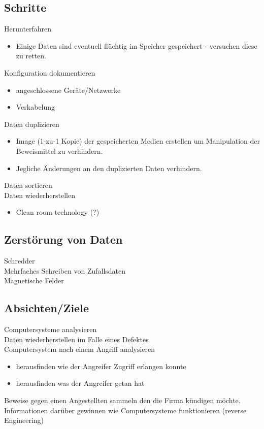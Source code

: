 \documentclass{article} %
\begin{document}
\subsection{Schritte}
Herunterfahren
\begin{itemize}
	\item Einige Daten sind eventuell flüchtig im Speicher gespeichert - versuchen diese zu retten.
\end{itemize}
Konfiguration dokumentieren
\begin{itemize}
	\item angeschlossene Geräte/Netzwerke
    \item Verkabelung
\end{itemize}
Daten duplizieren
\begin{itemize}
	\item Image (1-zu-1 Kopie) der gespeicherten Medien erstellen um Manipulation der Beweismittel zu verhindern.
    \item Jegliche Änderungen an den duplizierten Daten verhindern.
\end{itemize}
Daten sortieren\\
Daten wiederherstellen
\begin{itemize}
	\item Clean room technology (?)
\end{itemize}
\subsection{Zerstörung von Daten}
Schredder\\
Mehrfaches Schreiben von Zufallsdaten\\
Magnetische Felder\\
\subsection{Absichten/Ziele}
Computersysteme analysieren\\
Daten wiederherstellen im Falle eines Defektes\\
Computersystem nach einem Angriff analysieren
\begin{itemize}
	\item herausfinden wie der Angreifer Zugriff erlangen konnte
    \item herausfinden was der Angreifer getan hat
\end{itemize}
Beweise gegen einen Angestellten sammeln den die Firma kündigen möchte.\\
Informationen darüber gewinnen wie Computersysteme funktionieren (reverse Engineering)
\end{document}

